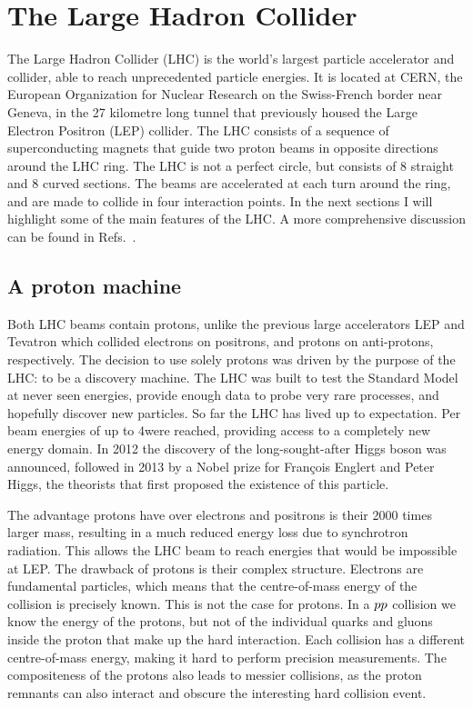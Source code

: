 \chapter{The Large Hadron Collider \label{chap:LHC}}




The Large Hadron Collider (LHC) is the world’s largest particle accelerator and collider, able to
reach unprecedented particle energies. It is located at CERN, the European Organization for Nuclear
Research on the Swiss-French border near Geneva, in the 27 kilometre long tunnel that previously
housed the Large Electron Positron (LEP) collider. The LHC consists of a sequence of superconducting
magnets that guide two proton beams in opposite directions around the LHC ring. 
The LHC is not a perfect circle, but consists of 8 straight and 8 curved sections. 
The beams are accelerated at each turn around the ring, and are made to collide in four interaction
points. In the
next sections I will highlight some of the main features of the LHC. A more comprehensive discussion
can be found in Refs.~\cite{Evans:2008zzb,Bruning:2007zzc}. 

\section{A proton machine \label{sec:LHC_proton_machine}}

Both LHC beams contain protons, unlike the previous large accelerators LEP and Tevatron which
collided electrons on positrons, and protons on anti-protons, respectively. 
The decision to use solely protons was driven by the purpose of the LHC: to be a discovery machine.
The LHC was built to test the Standard Model at never seen energies, provide enough data to
probe very rare processes, and hopefully discover new particles. So far the LHC has lived up to
expectation. Per beam energies of up to 4\TeV were reached, providing access to a completely new
energy domain. In 2012 the discovery of the long-sought-after Higgs boson was announced, followed in
2013 by a Nobel prize for Fran\c{c}ois Englert and Peter Higgs, the theorists that first proposed
the existence of this particle. 

The advantage protons have over electrons and positrons is their 2000 times larger mass, resulting
in a much reduced energy loss due to synchrotron radiation. This allows the LHC beam to reach
energies that would be impossible at LEP.
The drawback of protons is their complex structure. Electrons are fundamental particles, which
means that the centre-of-mass energy of the collision is precisely known. This is not the case for
protons. In a ${p}{p}$ collision we know the energy of the protons, but not of the individual quarks
and gluons inside the proton that make up the hard interaction. Each collision has a different
centre-of-mass energy, making it hard to perform precision measurements. The compositeness of the
protons also leads to messier collisions, as the proton remnants can also interact and obscure the
interesting hard collision event. 

